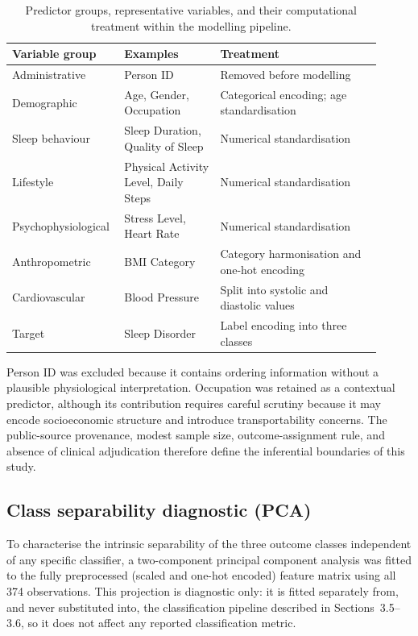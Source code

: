 \documentclass{elektr}
\begin{document}
\begin{table}[ht]
\centering
\caption{Predictor groups, representative variables, and their computational treatment within the modelling pipeline.}
\label{tab:variables}
\small
\begin{tabular}{L{0.24\linewidth}L{0.25\linewidth}L{0.42\linewidth}}
\toprule
Variable group & Examples & Treatment \\
\midrule
Administrative & Person ID & Removed before modelling \\
Demographic & Age, Gender, Occupation & Categorical encoding; age standardisation \\
Sleep behaviour & Sleep Duration, Quality of Sleep & Numerical standardisation \\
Lifestyle & Physical Activity Level, Daily Steps & Numerical standardisation \\
Psychophysiological & Stress Level, Heart Rate & Numerical standardisation \\
Anthropometric & BMI Category & Category harmonisation and one-hot encoding \\
Cardiovascular & Blood Pressure & Split into systolic and diastolic values \\
Target & Sleep Disorder & Label encoding into three classes \\
\bottomrule
\end{tabular}
\end{table}

Person ID was excluded because it contains ordering information without a plausible physiological interpretation. Occupation was retained as a contextual predictor, although its contribution requires careful scrutiny because it may encode socioeconomic structure and introduce transportability concerns. The public-source provenance, modest sample size, outcome-assignment rule, and absence of clinical adjudication therefore define the inferential boundaries of this study.


\subsection{Class separability diagnostic (PCA)}
\label{sec:pca}
To characterise the intrinsic separability of the three outcome classes independent of any specific classifier, a two-component principal component analysis was fitted to the fully preprocessed (scaled and one-hot encoded) feature matrix using all 374 observations. This projection is diagnostic only: it is fitted separately from, and never substituted into, the classification pipeline described in Sections~3.5--3.6, so it does not affect any reported classification metric.
\end{document}
